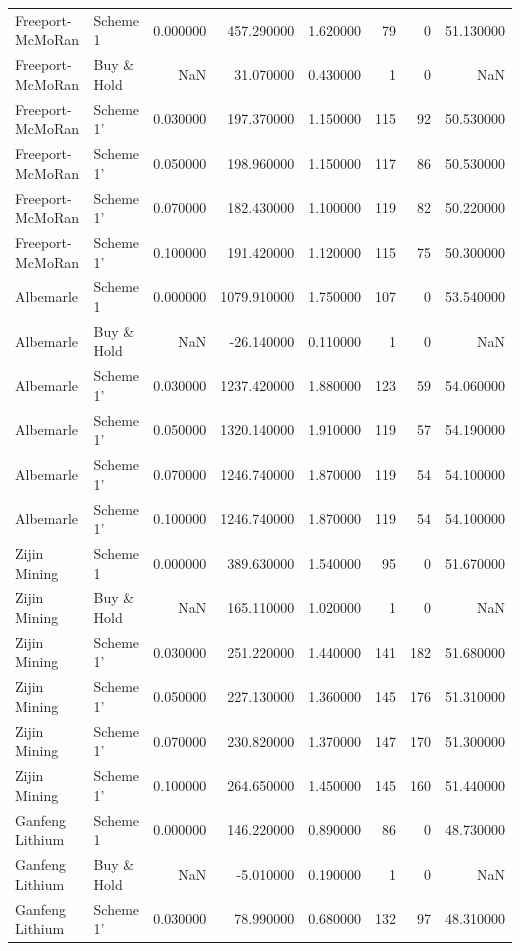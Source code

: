 \begin{longtable}{llrrrrrr}
Freeport-McMoRan & Scheme 1 & 0.000000 & 457.290000 & 1.620000 & 79 & 0 & 51.130000 \\
Freeport-McMoRan & Buy \& Hold & NaN & 31.070000 & 0.430000 & 1 & 0 & NaN \\
Freeport-McMoRan & Scheme 1' & 0.030000 & 197.370000 & 1.150000 & 115 & 92 & 50.530000 \\
Freeport-McMoRan & Scheme 1' & 0.050000 & 198.960000 & 1.150000 & 117 & 86 & 50.530000 \\
Freeport-McMoRan & Scheme 1' & 0.070000 & 182.430000 & 1.100000 & 119 & 82 & 50.220000 \\
Freeport-McMoRan & Scheme 1' & 0.100000 & 191.420000 & 1.120000 & 115 & 75 & 50.300000 \\
Albemarle & Scheme 1 & 0.000000 & 1079.910000 & 1.750000 & 107 & 0 & 53.540000 \\
Albemarle & Buy \& Hold & NaN & -26.140000 & 0.110000 & 1 & 0 & NaN \\
Albemarle & Scheme 1' & 0.030000 & 1237.420000 & 1.880000 & 123 & 59 & 54.060000 \\
Albemarle & Scheme 1' & 0.050000 & 1320.140000 & 1.910000 & 119 & 57 & 54.190000 \\
Albemarle & Scheme 1' & 0.070000 & 1246.740000 & 1.870000 & 119 & 54 & 54.100000 \\
Albemarle & Scheme 1' & 0.100000 & 1246.740000 & 1.870000 & 119 & 54 & 54.100000 \\
Zijin Mining & Scheme 1 & 0.000000 & 389.630000 & 1.540000 & 95 & 0 & 51.670000 \\
Zijin Mining & Buy \& Hold & NaN & 165.110000 & 1.020000 & 1 & 0 & NaN \\
Zijin Mining & Scheme 1' & 0.030000 & 251.220000 & 1.440000 & 141 & 182 & 51.680000 \\
Zijin Mining & Scheme 1' & 0.050000 & 227.130000 & 1.360000 & 145 & 176 & 51.310000 \\
Zijin Mining & Scheme 1' & 0.070000 & 230.820000 & 1.370000 & 147 & 170 & 51.300000 \\
Zijin Mining & Scheme 1' & 0.100000 & 264.650000 & 1.450000 & 145 & 160 & 51.440000 \\
Ganfeng Lithium & Scheme 1 & 0.000000 & 146.220000 & 0.890000 & 86 & 0 & 48.730000 \\
Ganfeng Lithium & Buy \& Hold & NaN & -5.010000 & 0.190000 & 1 & 0 & NaN \\
Ganfeng Lithium & Scheme 1' & 0.030000 & 78.990000 & 0.680000 & 132 & 97 & 48.310000 \\

\end{longtable}
